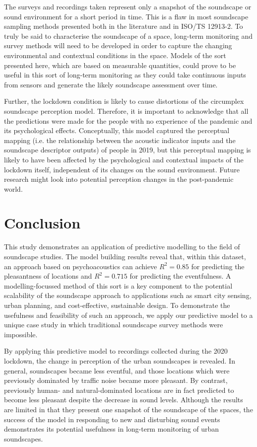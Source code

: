    The surveys and recordings taken represent only a snapshot of the soundscape or sound environment for a short period in time. This is a flaw in most soundscape sampling methods presented both in the literature and in ISO/TS 12913-2. To truly be said to characterise the soundscape of a space, long-term monitoring and survey methods will need to be developed in order to capture the changing environmental and contextual conditions in the space. Models of the sort presented here, which are based on measurable quantities, could prove to be useful in this sort of long-term monitoring as they could take continuous inputs from sensors and generate the likely soundscape assessment over time.

   Further, the lockdown condition is likely to cause distortions of the circumplex soundscape perception model. Therefore, it is important to acknowledge that all the predictions were made for the people with no experience of the pandemic and its psychological effects. Conceptually, this model captured the perceptual mapping (i.e. the relationship between the acoustic indicator inputs and the soundscape descriptor outputs) of people in 2019, but this perceptual mapping is likely to have been affected by the psychological and contextual impacts of the lockdown itself, independent of its changes on the sound environment. Future research might look into potential perception changes in the post-pandemic world.


\section{Conclusion}

 This study demonstrates an application of predictive modelling to the field of soundscape studies. The model building results reveal that, within this dataset, an approach based on psychoacoustics can achieve $R^2=0.85$ for predicting the pleasantness of locations and $R^2=0.715$ for predicting the eventfulness. A modelling-focussed method of this sort is a key component to the potential scalability of the soundscape approach to applications such as smart city sensing, urban planning, and cost-effective, sustainable design. To demonstrate the usefulness and feasibility of such an approach, we apply our predictive model to a unique case study in which traditional soundscape survey methods were impossible.

 By applying this predictive model to recordings collected during the 2020 lockdown, the change in perception of the urban soundscapes is revealed. In general, soundscapes became less eventful, and those locations which were previously dominated by traffic noise became more pleasant. By contrast, previously human- and natural-dominated locations are in fact predicted to become less pleasant despite the decrease in sound levels. Although the results are limited in that they present one snapshot of the soundscape of the spaces, the success of the model in responding to new and disturbing sound events demonstrates its potential usefulness in long-term monitoring of urban soundscapes.

